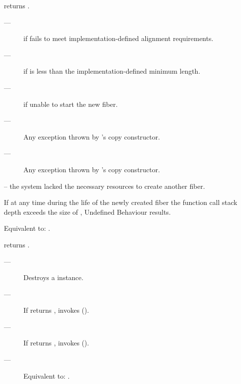 \postcond
\emptyfn returns \false.

\except
\begin{description}
    \item[---]  if  fails to meet
               implementation-defined alignment requirements.
    \item[---]  if  is less than the
               implementation-defined minimum length.
    \item[---]  if unable to start the new fiber.
    \item[---] Any exception thrown by 's copy constructor.
    \item[---] Any exception thrown by 's copy constructor.
\end{description}

\errors
{} -- the system lacked the necessary resources to create another fiber.

\remarks
If at any time during the life of the newly created fiber the
function call stack depth exceeds the size of , Undefined
Behaviour results.


\effects
Equivalent to: .

\postcond
{}\emptyfn returns \true.


\effects
\begin{description}
    \item[---] Destroys a \fiber instance.
    \item[---] If \emptyfn returns \false, invokes  ().
\end{description}



\effects
\begin{description}
    \item[---] If \emptyfn returns \false, invokes  ().
    \item[---] Equivalent to: .
\end{description}

